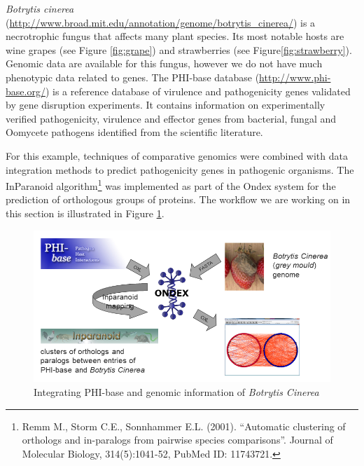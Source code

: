 \textit{Botrytis cinerea} (\url{http://www.broad.mit.edu/annotation/genome/botrytis_cinerea/}) is a necrotrophic fungus that affects many plant species. 
Its most notable hosts are wine grapes (see Figure \ref{fig:grape}) and strawberries (see Figure\ref{fig:strawberry}). 
Genomic data are available for this fungus, however we do not have much phenotypic data related to genes.
The PHI-base database (\url{http://www.phi-base.org/}) is a reference database of virulence and pathogenicity genes validated by gene disruption experiments. 
It contains information on experimentally verified pathogenicity, virulence and effector genes from bacterial, 
fungal and Oomycete pathogens identified from the scientific literature. 

For this example, techniques of comparative genomics were combined with data integration methods to predict pathogenicity genes in pathogenic organisms. 
The InParanoid algorithm\footnote{Remm M., Storm C.E., Sonnhammer E.L. (2001). 
``Automatic clustering of orthologs and in-paralogs from pairwise species comparisons''. Journal of Molecular Biology, 314(5):1041-52, PubMed ID: 11743721.}
was implemented as part of the Ondex system for the prediction of orthologous groups of proteins.
The workflow we are working on in this section is illustrated in Figure \ref{fig:phi_bot}.

\begin{figure}[H]
\centering
\includegraphics[scale=0.5]{images/Oct12/integration_phi_bot.png} 
\caption{Integrating PHI-base and genomic information of \textit{Botrytis Cinerea}}
\label{fig:phi_bot}
\end{figure}


